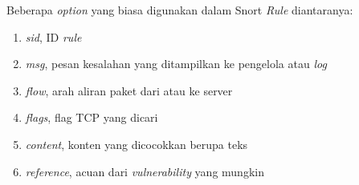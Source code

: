     Beberapa \emph{option} yang biasa digunakan dalam Snort \emph{Rule} diantaranya:
    \begin{enumerate} 
      \item \emph{sid}, ID \emph{rule}
      \item \emph{msg}, pesan kesalahan yang ditampilkan ke pengelola atau \emph{log}
      \item \emph{flow}, arah aliran paket dari atau ke server
      \item \emph{flags}, flag TCP yang dicari
      \item \emph{content}, konten yang dicocokkan berupa teks
      \item \emph{reference}, acuan dari \emph{vulnerability} yang mungkin
    \end{enumerate} 








